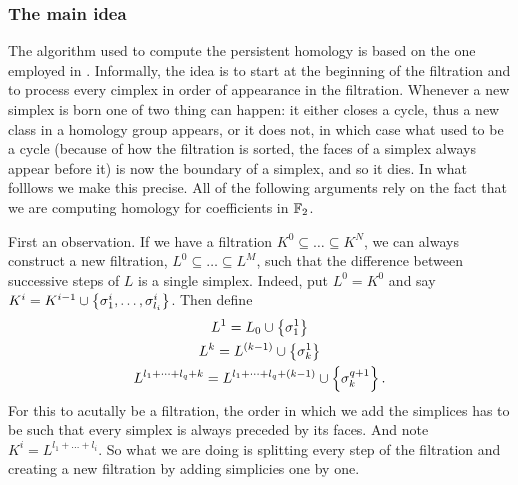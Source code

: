 \documentclass[../main.tex]{subfiles}
\begin{document}
\subsubsection{The main idea}
The algorithm used to compute the persistent homology is based on the one employed in 
\cite{campos}. Informally, the idea is to start at the beginning of the filtration and to
process every cimplex in order of appearance in the filtration. Whenever a new simplex is
born one of two thing can happen: it either closes a cycle, thus a new class in a homology
group appears, or it does not, in which case what used to be a cycle (because of how the
filtration is sorted, the faces of a simplex always appear before it) is now the boundary
of a simplex, and so it dies. In what folllows we make this precise. All of the following
arguments rely on the fact that we are computing homology for coefficients in \( \mathbb{F}_2 \).

First an observation. If we have a filtration \( K^0 \subseteq \dots \subseteq K^N \), we
can always construct a new filtration, \( L^0 \subseteq \dots \subseteq L^M \), such that
the difference between successive steps of \( L \) is a single simplex. Indeed, put \( L^0
= K^0 \) and say \( K^i = K^{i-1} \cup \left\{ \sigma^i_1, \dots, \sigma^i_{l_i} \right\} \). Then define
\begin{gather*}
	L^1 = L_0 \cup \left\{ \sigma_1^1 \right\} \\
	L^{k} = L^{(k-1)} \cup \left\{ \sigma_k^1 \right\} \\
	L^{l_1 + \dots + l_q + k} = L^{l_1 + \dots + l_q + (k-1)} \cup \left\{ \sigma_k^{q+1} \right\}.
\end{gather*}
For this to acutally be a filtration, the order in which we add the simplices has to be
such that every simplex is always preceded by its faces. And note \( K^i = L^{l_1 + \dots
+ l_i} \). So what we are doing is splitting every step of the filtration and creating a
new filtration by adding simplicies one by one. 
\end{document}
